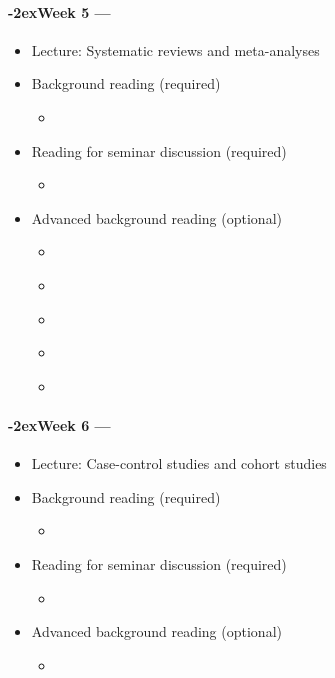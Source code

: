 \documentclass[a4paper, 11pt]{article}
\newcommand{\week}[1]{%
  \paragraph*{\kern-2ex\quad #1 --- \syldate{\today}}%


  \ifdim\wd1=\wd\MONDAY
    \AdvanceDate[7]
  \else
    \AdvanceDate[7]
  \fi
}
\begin{document}
\week{Week 5} 
\begin{itemize}
\item Lecture: Systematic reviews and meta-analyses
\item Background reading (required)
	\begin{itemize}
	\item \citet[chapter 8]{Dollaghan2007a}
	\end{itemize}
\item Reading for seminar discussion (required)
	\begin{itemize}
	\item \citet{Roberts2011}
	\end{itemize}
\item Advanced background reading (optional)
	\begin{itemize}
	\item \citet[pp. 15--48]{Haynes2006}
	\item \citet{Schlosser2007}
	\item \citet{Wilson2011}
	\item \citet{HigginsGreen2008}
	\item \citet{Borenstein2009}
	\end{itemize}
\end{itemize}

\week{Week 6} 
\begin{itemize}
\item Lecture: Case-control studies and cohort studies
\item Background reading (required)
	\begin{itemize}
	\item \citet[review pp. 33--35]{Dollaghan2007a}
	\end{itemize}
\item Reading for seminar discussion (required)
	\begin{itemize}
	\item \citet{Rudolph2016}
	\end{itemize}
\item Advanced background reading (optional)
	\begin{itemize}
	\item \citet[pp. 100--121]{Ajetunmobi2002}
	\end{itemize}
\end{itemize}
\end{document}
